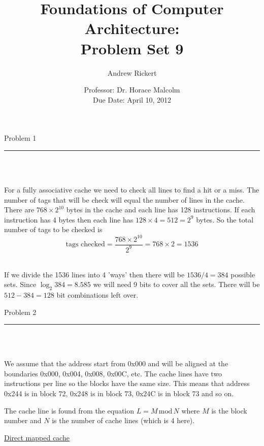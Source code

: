 \documentclass[11pt,reqno]{article}
\title{Foundations of Computer Architecture: \\ Problem Set 9 }
\author{Andrew Rickert}
\date{Professor: Dr. Horace Malcolm \\ \hspace{-39pt} Due Date: April 10,  2012}                                           %
\begin{document}
\maketitle


\begin{flushleft} 
Problem 1 \\
\rule{500pt}{1pt}\\
\end{flushleft} 

\noindent{}\\ 

For a fully associative cache we need to check all lines to find a hit or a miss. The number of tags that will be check will equal the number of lines in the cache. There are $768 \times 2^{10}$ bytes in the cache and each line has 128 instructions. If each instruction has 4 bytes then each line has $128 \times 4 = 512 = 2^9$ bytes. So the total number of tags to be checked is 
\[ \text{tags checked} = \frac{768 \times 2^{10}}{2^9} = 768 \times 2 = 1536 \]

\noindent{}\\ 

If we divide the 1536 lines into 4 'ways' then there will be $1536/4 = 384$ possible sets. Since $\log_2 384 = 8.585$ we will need 9 bits to cover all the sets. There will be $512 - 384 = 128$ bit combinations left over.
\newpage

\begin{flushleft} 
Problem 2 \\
\rule{500pt}{1pt}\\
\end{flushleft} 

\noindent{}\\ 

We assume that the address start from 0x000 and will be aligned at the boundaries 0x000, 0x004, 0x008, 0x00C, etc. The cache lines have two instructions per line so the blocks have the same size. This means that address 0x244 is in block 72, 0x248 is in block 73, 0x24C is in block 73 and so on.

The cache line is found from the equation $L = M \, \text{mod} \, N$ where $M$ is the block number and $N$ is the number of cache lines (which is 4 here).

\noindent \underline{Direct mapped cache}\\
\end{document}

